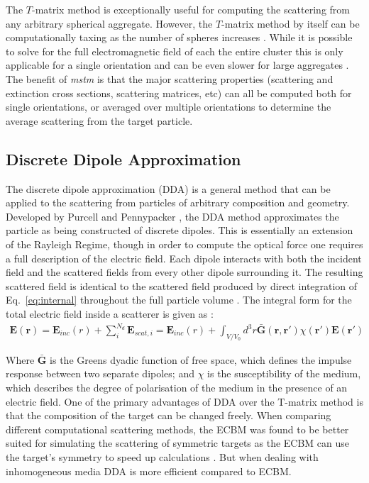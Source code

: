 The $T$-matrix method is exceptionally useful for computing the 
scattering from any arbitrary spherical aggregate. However, the 
$T$-matrix method by itself can be computationally taxing as the 
number of spheres increases \cite{Mackowski2011}. While it is 
possible to solve for the full electromagnetic field of each the 
entire cluster this is only applicable for a single orientation 
and can be even slower for large aggregates \cite{Mackowski1996, 
Xu1995}. The benefit of \textit{mstm} is that the major scattering 
properties (scattering and extinction cross sections, scattering 
matrices, etc) can all be computed both for single orientations, 
or averaged over multiple orientations to determine the average 
scattering from the target particle. 

\subsection{Discrete Dipole Approximation}
The discrete dipole approximation (DDA) is a general method that 
can be applied to the scattering from particles of arbitrary 
composition and geometry. Developed by Purcell and Pennypacker \cite{Purcell1973}, the DDA method approximates the particle as 
being constructed of discrete dipoles. This is essentially an 
extension of the Rayleigh Regime, though in order to compute the 
optical force one requires a full description of the electric 
field. Each dipole interacts with both the incident field and the 
scattered fields from every other dipole surrounding it. The 
resulting scattered field is identical to the scattered field 
produced by direct integration of Eq.~\eqref{eq:internal} 
throughout the full particle volume \cite{Goedecke1988}. The 
integral form for the total electric field inside a scatterer is 
given as \cite{Wriedt1998}:
\begin{align}
	\mathbf{E(r)} = \mathbf{E}_{inc}(r) + \sum^{N_d}_{i}\mathbf{E}_{scat,i} =  \mathbf{E}_{inc}(r) + \int_{V/V_0}d^3r\mathbf{\bar{G}(r,r')}
	\chi(\mathbf{r'})\mathbf{E(r')}
	\label{eq:DDA}
\end{align}

Where $\mathbf{\bar{G}}$ is the Greens dyadic function of free space, 
which defines the impulse response between two separate dipoles; and 
$\chi$ is the susceptibility of the medium, which describes the 
degree of polarisation of the medium in the presence of an electric 
field. One of the primary advantages of DDA over the T-matrix method 
is that the composition of the target can be changed freely. When 
comparing different computational scattering methods, the ECBM was 
found to be better suited for simulating the scattering of symmetric
targets as the ECBM can use the target's symmetry to speed up 
calculations \cite{Wriedt1998}. But when dealing with inhomogeneous 
media DDA is more efficient compared to ECBM. 

